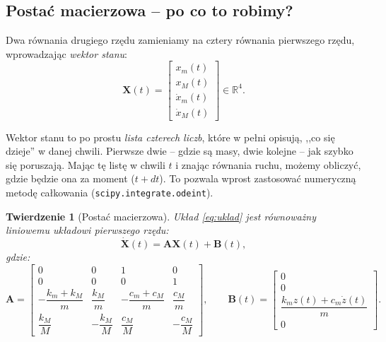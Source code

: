 \documentclass[11pt,a4paper]{article}
\newcommand{\R}{\mathbb{R}}
\renewcommand{\vec}[1]{\mathbf{#1}}
\theoremstyle{plainpol}
\newtheorem{twierdzenie}[definicja]{Twierdzenie}
\begin{document}
\subsection{Postać macierzowa -- po co to robimy?}

Dwa równania drugiego rzędu zamieniamy na cztery równania pierwszego
rzędu, wprowadzając \emph{wektor stanu}:
\begin{equation}
  \vec{X}(t) = \begin{bmatrix} x_m(t) \\ x_M(t) \\ \dot{x}_m(t) \\ \dot{x}_M(t) \end{bmatrix} \in \R^4.
\end{equation}

\begin{intuicja}
Wektor stanu to po prostu \emph{lista czterech liczb}, które w pełni
opisują, ,,co się dzieje'' w danej chwili. Pierwsze dwie -- gdzie są
masy, dwie kolejne -- jak szybko się poruszają. Mając tę listę
w chwili $t$ i znając równania ruchu, możemy obliczyć, gdzie będzie
ona za moment ($t + dt$). To pozwala wprost zastosować numeryczną
metodę całkowania (\texttt{scipy.integrate.odeint}).
\end{intuicja}

\begin{twierdzenie}[Postać macierzowa]
Układ \cref{eq:uklad} jest równoważny liniowemu układowi pierwszego rzędu:
\begin{equation}
  \dot{\vec{X}}(t) = \vec{A}\vec{X}(t) + \vec{B}(t),
  \label{eq:stan}
\end{equation}
gdzie:
\begin{equation}
  \vec{A} = \begin{bmatrix}
    0 & 0 & 1 & 0 \\
    0 & 0 & 0 & 1 \\
    -\dfrac{k_m+k_M}{m} & \dfrac{k_M}{m} & -\dfrac{c_m+c_M}{m} & \dfrac{c_M}{m} \\[6pt]
    \dfrac{k_M}{M} & -\dfrac{k_M}{M} & \dfrac{c_M}{M} & -\dfrac{c_M}{M}
  \end{bmatrix},\qquad
  \vec{B}(t) = \begin{bmatrix} 0 \\ 0 \\ \dfrac{k_m z(t) + c_m \dot{z}(t)}{m} \\ 0 \end{bmatrix}.
\end{equation}
\end{twierdzenie}
\end{document}
